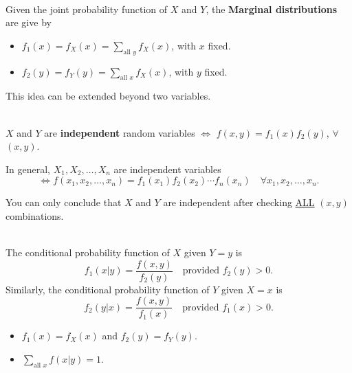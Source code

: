 \begin{definition}
    \phantom{}\\
    Given the joint probability function of $X$ and $Y$, the \textbf{Marginal distributions} are give by
    \begin{itemize}
        \item $f_1(x) = f_X(x) = \displaystyle \sum_{\text{all } y} f_X(x)$, with $x$ fixed.
        \item  $f_2(y) = f_Y(y) = \displaystyle \sum_{\text{all } x} f_X(x)$, with $y$ fixed.
    \end{itemize}
\end{definition}

\begin{remark}
    This idea can be extended beyond two variables.
\end{remark}

\begin{definition}
    \phantom{}\\
    $X$ and $Y$ are \textbf{independent} random variables $\iff$ $f(x, y) = f_1(x)f_2(y)$,
    $\forall$ $(x, y)$.
\end{definition}

In general, $X_1, X_2, \ldots, X_n$ are independent variables \vspace{-3mm}
    \[\iff f(x_1, x_2, \ldots, x_n) = f_1(x_1)f_2(x_2) \cdots f_n(x_n) \quad \forall x_1, x_2, \ldots, x_n.\]

\begin{remark}
    You can only conclude that $X$ and $Y$ are independent after checking \underline{ALL} $(x,y)$ combinations.
\end{remark}

\pagebreak

\begin{definition}
    \phantom{}  \\
    The conditional probability function of $X$ given $Y = y$ is
    \[f_1(x|y) = \frac{f(x, y)}{f_2(y)} \quad \text{provided $f_2(y) > 0$}.\]
    Similarly, the conditional probability function of $Y$ given $X = x$ is
    \[f_2(y|x) = \frac{f(x, y)}{f_1(x)} \quad \text{provided $f_1(x) > 0$}.\]
\end{definition}

\begin{note}
    \phantom{}
    \begin{itemize}
        \item $f_1(x) = f_X(x)$ and $f_2(y) = f_Y(y)$.
        \item $\displaystyle \sum_{\text{all } x} f(x|y) = 1$.
    \end{itemize}
\end{note}

